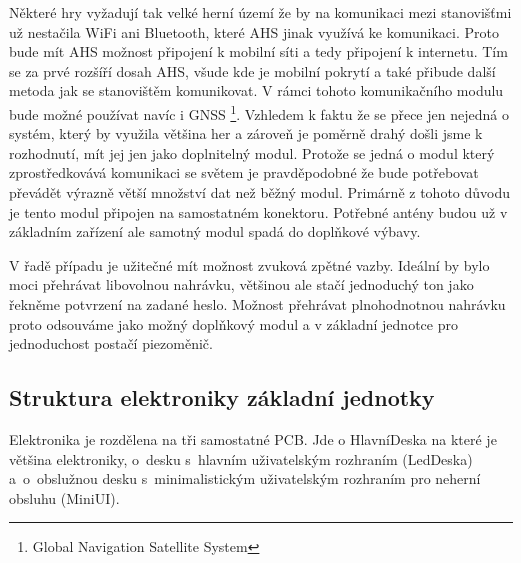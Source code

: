 Některé hry vyžadují tak velké herní území že by na komunikaci mezi stanovišťmi už nestačila WiFi ani Bluetooth, které AHS jinak využívá ke komunikaci.  
Proto bude mít AHS možnost připojení k mobilní síti a tedy připojení k internetu.
Tím se za prvé rozšíří dosah AHS, všude kde je mobilní pokrytí a také přibude další metoda jak se stanovištěm komunikovat.
V rámci tohoto komunikačního modulu bude možné používat navíc i GNSS \footnote{Global Navigation Satellite System}.
Vzhledem k faktu že se přece jen nejedná o systém, který by využila většina her a zároveň je poměrně drahý došli jsme k rozhodnutí, mít jej jen jako doplnitelný modul.
Protože se jedná o modul který zprostředkovává komunikaci se světem je pravděpodobné že bude potřebovat převádět výrazně větší množství dat než běžný modul.
Primárně z tohoto důvodu je tento modul připojen na samostatném konektoru.
Potřebné antény budou už v základním zařízení ale samotný modul spadá do doplňkové výbavy.

V řadě případu je užitečné mít možnost zvuková zpětné vazby.
Ideální by bylo moci přehrávat libovolnou nahrávku, většinou ale stačí jednoduchý ton jako řekněme potvrzení na zadané heslo.
Možnost přehrávat plnohodnotnou nahrávku proto odsouváme jako možný doplňkový modul a v základní jednotce pro jednoduchost postačí piezoměnič. 


\subsection{Struktura elektroniky základní jednotky}

Elektronika je rozdělena na tři samostatné PCB.
Jde o HlavníDeska na které je většina elektroniky, o~desku s~hlavním uživatelským rozhraním (LedDeska) a~o~obslužnou desku s~minimalistickým uživatelským rozhraním pro neherní obsluhu (MiniUI).

